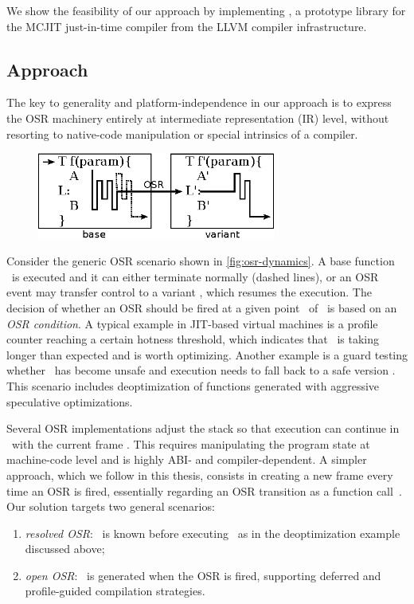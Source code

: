 \noindent We show the feasibility of our approach by implementing \osrkit, a prototype library for the MCJIT just-in-time compiler from the LLVM compiler infrastructure.

\subsection{Approach}

The key to generality and platform-independence in our approach is to express the OSR machinery entirely at intermediate representation (IR) level, without resorting to native-code manipulation or special intrinsics of a compiler.

\ifdefined\noauthorea
\begin{figure}[hb]
\begin{center}
\includegraphics[width=0.7\textwidth]{figures/osr-dynamics/osr-dynamics.eps}
\caption{\protect}
\end{center}
\end{figure}
\fi

\noindent Consider the generic OSR scenario shown in \myfigure\ref{fig:osr-dynamics}. A base function \fbase\ is executed and it can either terminate normally (dashed lines), or an OSR event may transfer control to a variant \fvariant, which resumes the execution. The decision of whether an OSR should be fired at a given point \osrpoint\ of \fbase\ is based on an {\em OSR condition}. A typical example in JIT-based virtual machines is a profile counter reaching a certain hotness threshold, which indicates that \fbase\ is taking longer than expected and is worth optimizing. Another example is a guard testing whether \fbase\ has become unsafe and execution needs to fall back to a safe version \fvariant. This scenario includes deoptimization of functions generated with aggressive speculative optimizations.

Several OSR implementations adjust the stack so that execution can continue in \fvariant\ with the current frame \cite{Chambers91, Chambers92, Holzle92, Suganuma06}. This requires manipulating the program state at machine-code level and is highly ABI- and compiler-dependent. A simpler approach, which we follow in this thesis, consists in creating a new frame every time an OSR is fired, essentially regarding an OSR transition as a function call~\cite{Lameed13,Pizlo14}. Our solution targets two general scenarios:
\begin{enumerate}[parsep=0pt]
 \item {\em resolved OSR}: \fvariant\ is known before executing \fbase\ as in the deoptimization example discussed above;
 \item {\em open OSR}: \fvariant\ is generated when the OSR is fired, supporting deferred and profile-guided compilation strategies.
\end{enumerate}

